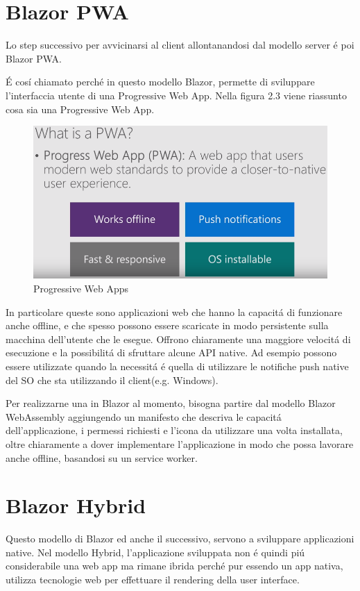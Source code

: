 \section{Blazor PWA}\label{sez:bpwa}
Lo step successivo per avvicinarsi al client allontanandosi dal modello server \'e poi Blazor PWA.

\'E cos\'i chiamato perch\'e in questo modello Blazor, permette di sviluppare l'interfaccia utente di una Progressive Web App.
Nella figura 2.3 viene riassunto cosa sia una Progressive Web App.

\begin{figure}[H]
	\centerline{\includegraphics[scale=0.5]{figure/ProgressiveWebApp.png}}
	\caption{Progressive Web Apps}
	\label{fig:WhatIsAPWA}
\end{figure}


In particolare queste sono applicazioni web che hanno la capacit\'a di funzionare anche offline, e che spesso possono essere scaricate in modo persistente sulla macchina dell'utente che le esegue.
Offrono chiaramente una maggiore velocit\'a di esecuzione e la possibilit\'a di sfruttare alcune API native.
Ad esempio possono essere utilizzate quando la necessit\'a \'e quella di utilizzare le notifiche push native del SO che sta utilizzando il client(e.g. Windows).

Per realizzarne una in Blazor al momento, bisogna partire dal modello Blazor WebAssembly aggiungendo un manifesto che descriva le capacit\'a dell'applicazione, i permessi richiesti e l'icona da utilizzare una volta installata, oltre chiaramente a dover implementare l'applicazione in modo che possa lavorare anche offline, basandosi su un service worker.\cite{blazorPWA}
\pagebreak

\section{Blazor Hybrid}\label{sez:bhybrid}
Questo modello di Blazor ed anche il successivo, servono a sviluppare applicazioni native.
Nel modello Hybrid, l'applicazione sviluppata non \'e quindi pi\'u considerabile una web app ma rimane ibrida perch\'e pur essendo un app nativa, utilizza tecnologie web per effettuare il rendering della user interface.

